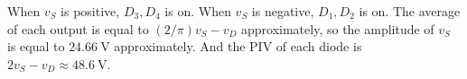 \documentclass[12pt, a4paper]{article}
\theoremstyle{mystyle}	%
\begin{document}
\begin{figure}[H]
  
  \caption{}
  \label{fig:3.60}
\end{figure}

When $v_S$ is positive, $D_3, D_4$ is on. When $v_S$ is negative, 
$D_1, D_2$ is on. The average of each output is equal to
$(2/\pi) v_S - v_D$ approximately, so the amplitude of $v_S$ is equal to
$\SI{24.66}{\V}$ approximately.
And the PIV of each diode is $2v_S - v_D \approx \SI{48.6}{\V}$.

% 
\end{document}
